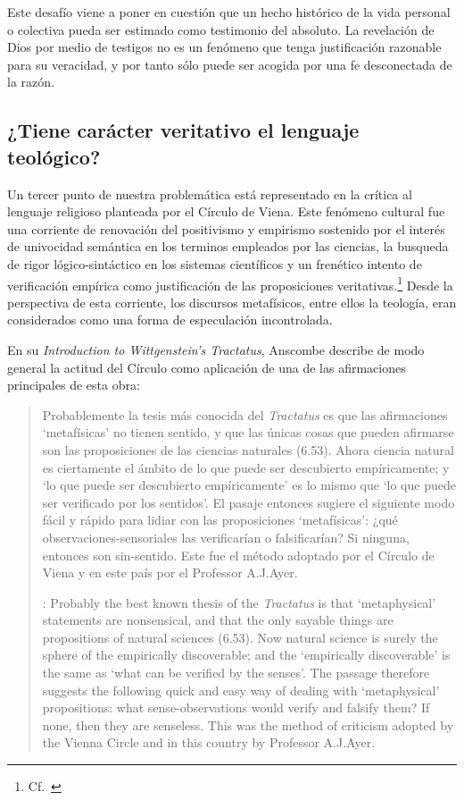 Este desafío viene a poner en cuestión que un hecho histórico de la vida
personal o colectiva pueda ser estimado como testimonio del absoluto. La
revelación de Dios por medio de testigos no es un fenómeno que tenga
justificación razonable para su veracidad, y por tanto sólo puede ser acogida
por una fe desconectada de la razón.

\subsection{¿Tiene carácter veritativo el lenguaje teológico?}
Un tercer punto de nuestra problemática está representado en la crítica al
lenguaje religioso planteada por el Círculo de Viena. Este fenómeno cultural fue
una corriente de renovación del positivismo y empirismo sostenido por el interés
de univocidad semántica en los terminos empleados por las ciencias, la busqueda
de rigor lógico-sintáctico en los sistemas científicos y un frenético intento de
verificación empírica como justificación de las proposiciones
veritativas.\footnote{Cf.~\cite[152]{dominguez2009at}} Desde la perspectiva de
esta corriente, los discursos metafísicos, entre ellos la teología, eran
considerados como una forma de especulación incontrolada.

En su \emph{Introduction to Wittgenstein's Tractatus}, Anscombe describe de modo
general la actitud del Círculo como aplicación de una de las afirmaciones
principales de esta obra: \blockquote[{\cite[150]{anscombe1959iwt}}: Probably
the best known thesis of the \emph{Tractatus} is that `metaphysical' statements
are nonsensical, and that the only sayable things are propositions of natural
sciences (6.53). Now natural science is surely the sphere of the empirically
discoverable; and the `empirically discoverable' is the same as `what can be
verified by the senses'. The passage therefore suggests the following quick and
easy way of dealing with `metaphysical' propositions: what sense-observations
would verify and falsify them? If none, then they are senseless. This was the
method of criticism adopted by the Vienna Circle and in this country by
Professor A.J.Ayer.]{Probablemente la tesis más conocida del \emph{Tractatus} es
  que las afirmaciones `metafísicas' no tienen sentido, y que las únicas cosas
  que pueden afirmarse son las proposiciones de las ciencias naturales (6.53).
  Ahora ciencia natural es ciertamente el ámbito de lo que puede ser descubierto
  empíricamente; y `lo que puede ser descubierto empíricamente' es lo mismo que
  `lo que puede ser verificado por los sentidos'. El pasaje entonces sugiere el
  siguiente modo fácil y rápido para lidiar con las proposiciones `metafísicas':
  ¿qué observaciones-sensoriales las verificarían o falsificarían? Si ninguna,
  entonces son sin-sentido. Este fue el método adoptado por el Círculo de Viena
  y en este país por el Professor A.J.Ayer.}

